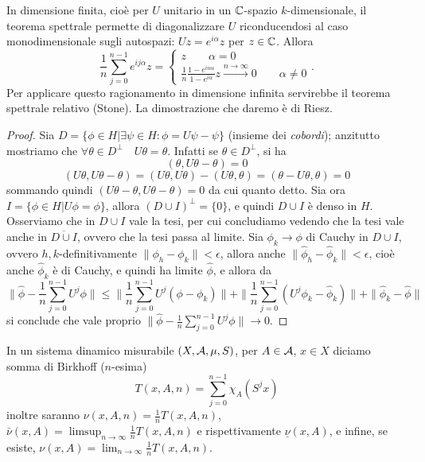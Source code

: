 \begin{oss}
 In dimensione finita, cioè per $U$ unitario in un $\mathbb{C}$-spazio $k$-dimensionale, il teorema spettrale permette di diagonalizzare $U$ riconducendosi al caso monodimensionale sugli autospazi: $Uz=e^{i\alpha}z$ per $z\in\mathbb{C}$. Allora
 \[\frac{1}{n}\sum_{j=0}^{n-1}e^{ij\alpha}z=\begin{cases} z \qquad \alpha=0 \\ \frac{1}{n}\frac{1-e^{in\alpha}}{1-e^{i\alpha}}z \overset{n\rightarrow\infty}{\longrightarrow}0 \qquad \alpha\neq 0\end{cases}   .                                                                                                                                                                                            \]
 Per applicare questo ragionamento in dimensione infinita servirebbe il teorema spettrale relativo (Stone). La dimostrazione che daremo è di Riesz.
\end{oss}

\begin{proof}
 Sia $D=\{\phi\in H|\exists\psi\in H : \phi=U\psi-\psi\}$ (insieme dei \emph{cobordi}); anzitutto mostriamo che $\forall \theta \in D^\bot \quad U\theta=\theta$. Infatti se $\theta \in D^\bot$, si ha
 \[(\theta, U\theta-\theta)=0\]
 \[(U\theta,U\theta-\theta)=(U\theta,U\theta)-(U\theta,\theta)=(\theta-U\theta,\theta)=0\]
 sommando quindi $(U\theta-\theta,U\theta-\theta)=0$ da cui quanto detto.
 Sia ora $I=\{\phi\in H | U\phi=\phi\}$, allora $(D\cup I)^\bot=\{0\}$, e quindi $D\cup I$ è denso in $H$. Osserviamo che in $D\cup I$ vale la tesi, per cui concludiamo vedendo che la tesi vale anche in $\overline{D\cup I}$, ovvero che la tesi passa al limite. Sia $\phi_k\rightarrow\phi$ di Cauchy in $D\cup I$, ovvero $h,k$-definitivamente $\|\phi_h-\phi_k\|<\epsilon$, allora anche $\|\hat\phi_h-\hat\phi_k\|<\epsilon$, cioè anche $\hat\phi_k$ è di Cauchy, e quindi ha limite $\hat\phi$, e allora da
 \[\|\hat\phi-\frac{1}{n}\sum_{j=0}^{n-1}U^j\phi\|\leq \|\frac{1}{n}\sum_{j=0}^{n-1}U^j(\phi-\phi_k)\|+
  \|\frac{1}{n}\sum_{j=0}^{n-1}(U^j\phi_k-\hat\phi_k)\|+\|\hat\phi_k-\hat\phi\|\]
 si conclude che vale proprio $\|\hat\phi-\frac{1}{n}\sum_{j=0}^{n-1}U^j\phi\|\rightarrow 0$.
\end{proof}

\begin{defi}In un sistema dinamico misurabile $(X,\mathcal{A},\mu,S)$, per $A\in\mathcal{A}$, $x\in X$ diciamo somma di Birkhoff ($n$-esima) \[T(x,A,n)=\sum_{j=0}^{n-1}\chi_A(S^jx)\]
inoltre saranno $\nu(x,A,n)=\frac{1}{n}T(x,A,n)$, $\bar\nu(x,A)=\limsup_{n\rightarrow\infty}\frac{1}{n}T(x,A,n)$ e rispettivamente $\underline\nu(x,A)$, e infine, se esiste, $\nu(x,A)=\lim_{n\rightarrow\infty}\frac{1}{n}T(x,A,n)$.
\end{defi}


